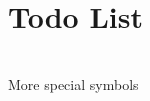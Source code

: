 \chapter{Todo List }
\hypertarget{todo}{}\label{todo}

\begin{DoxyRefList}
\item[{\parbox[t]{\linewidth}{Member \doxylink{class_tm1637_device_model_ae01b9f2a5ec43ae337622665e231dcba}{Tm1637\+Device\+Model::\+ESymbol} }}]\hfill \\
\label{todo__todo000001}%
%
More special symbols 
\end{DoxyRefList}